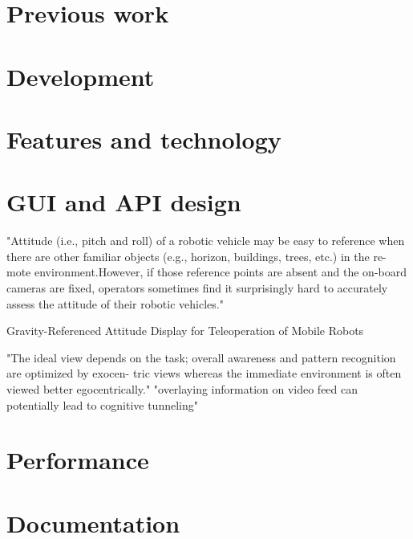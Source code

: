 \section{Previous work}
\section{Development}
\section{Features and technology}
\section{GUI and API design}

\citep{Chen2007} "Attitude (i.e., pitch and roll) of a robotic vehicle may be easy to reference when there are other familiar objects (e.g., horizon, buildings, trees, etc.) in the re- mote environment.However, if those reference points are absent and the on-board cameras are fixed, operators sometimes find it surprisingly hard to accurately assess the attitude of their robotic vehicles."

\citep{Wang2004} Gravity-Referenced Attitude Display for Teleoperation of Mobile Robots

\citep{Chen2007} "The ideal view depends on the task; overall awareness and pattern recognition are optimized by exocen- tric views whereas the immediate environment is often viewed better egocentrically."
"overlaying information on video feed can potentially lead to cognitive tunneling"

\section{Performance}
\section{Documentation}

